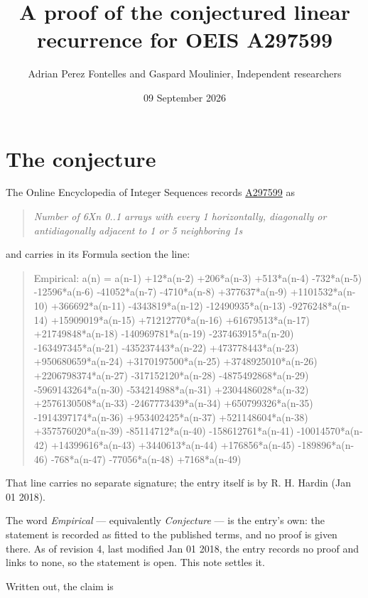 \documentclass[11pt]{article}
\title{A proof of the conjectured linear recurrence for OEIS A297599}
\author{Adrian Perez Fontelles and Gaspard Moulinier, Independent researchers}
\date{09 September 2026}
\theoremstyle{definition}
\begin{document}
\maketitle
\section{The conjecture}

The Online Encyclopedia of Integer Sequences records \href{https://oeis.org/A297599}{A297599} as

\begin{quote}\itshape Number of 6Xn 0..1 arrays with every 1 horizontally, diagonally or antidiagonally adjacent to 1 or 5 neighboring 1s\end{quote}

and carries in its Formula section the line:

\begin{quote}\ttfamily Empirical: a(n) = a(n-1) +12*a(n-2) +206*a(n-3) +513*a(n-4) -732*a(n-5) -12596*a(n-6) -41052*a(n-7) -4710*a(n-8) +377637*a(n-9) +1101532*a(n-10) +366692*a(n-11) -4343819*a(n-12) -12490935*a(n-13) -9276248*a(n-14) +15909019*a(n-15) +71212770*a(n-16) +61679513*a(n-17) +21749848*a(n-18) -140969781*a(n-19) -237463915*a(n-20) -163497345*a(n-21) -435237443*a(n-22) +473778443*a(n-23) +950680659*a(n-24) +3170197500*a(n-25) +3748925010*a(n-26) +2206798374*a(n-27) -317152120*a(n-28) -4875492868*a(n-29) -5969143264*a(n-30) -534214988*a(n-31) +2304486028*a(n-32) +2576130508*a(n-33) -2467773439*a(n-34) +650799326*a(n-35) -1914397174*a(n-36) +953402425*a(n-37) +521148604*a(n-38) +357576020*a(n-39) -85114712*a(n-40) -158612761*a(n-41) -10014570*a(n-42) +14399616*a(n-43) +3440613*a(n-44) +176856*a(n-45) -189896*a(n-46) -768*a(n-47) -77056*a(n-48) +7168*a(n-49)\end{quote}

That line carries no separate signature; the entry itself is by R. H. Hardin (Jan 01 2018).

The word {\itshape Empirical} --- equivalently {\itshape Conjecture} --- is the entry's own: the statement is recorded as fitted to the published terms, and no proof is given there. As of revision 4, last modified Jan 01 2018, the entry records no proof and links to none, so the statement is open. This note settles it.

Written out, the claim is
\end{document}
